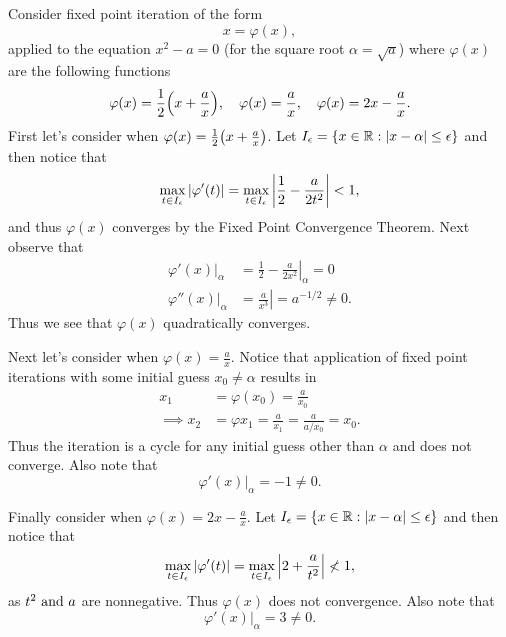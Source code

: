 \documentclass[12pt]{report}
\begin{document}
\begin{solution}

    \noindent
    Consider fixed point iteration of the form
    \[ 
        x = \varphi(x),    
    \]
    applied to the equation $x^2  - a = 0$ (for the square root $\alpha = \sqrt{a}$) where $\varphi(x)$ are the following functions
    \[
        \varphi(x) = \frac{1}{2}{\left(x + \frac{a}{x}\right)}, ~~~ \varphi(x) = \frac{a}{x}, ~~~ \varphi(x) = 2x - \frac{a}{x}.
    \]
    First let's consider when $\varphi(x) = \frac{1}{2}{\left(x + \frac{a}{x}\right)}$. Let $I_{\epsilon} = \{x \in {\mathbb R}: |x -\alpha| \leq {\epsilon}\}$ and then notice that 
    \[ 
        \max_{t \in I_{\epsilon}} \left| \varphi'(t) \right| = \max_{t \in I_{\epsilon}} \left| \frac{1}{2} - \frac{a}{2t^2} \right| < 1,
    \]
    and thus $\varphi(x)$ converges by the Fixed Point Convergence Theorem. Next observe that
    \begin{align*}
        \left. \varphi'(x) \right|_{\alpha} &= \left. \frac{1}{2} - \frac{a}{2x^2} \right|_{\alpha} = 0\\
        \left. \varphi''(x)  \right|_{\alpha} &= \left. \frac{a}{x^3} \right| = a^{-1/2} \neq 0. 
    \end{align*}
    Thus we see that $\varphi(x)$ quadratically converges.
    
    \noindent
    Next let's consider when $\varphi(x) = \frac{a}{x}$. Notice that application of fixed point iterations with some initial guess $x_0 \neq \alpha$ results in
    \begin{align*}
        x_1 &= \varphi(x_0) = \frac{a}{x_0}\\
        \implies x_2 &= \varphi{x_1} = \frac{a}{x_1} = \frac{a}{a/x_0} = x_0.
    \end{align*} 
    Thus the iteration is a cycle for any initial guess other than $\alpha$ and does not converge. Also note that
    \[ 
        \left. \varphi'(x) \right|_\alpha = -1 \neq 0. 
    \] 


    \noindent
    Finally consider when $\varphi(x) = 2x - \frac{a}{x}$. Let $I_{\epsilon} = \{x \in {\mathbb R}: |x -\alpha| \leq {\epsilon}\}$ and then notice that 
    \[ 
        \max_{t \in I_{\epsilon}} \left| \varphi'(t) \right| = \max_{t \in I_{\epsilon}} \left| 2 + \frac{a}{t^2} \right| \nless 1,
    \]
    as $t^2 {~\text{and}~} a$ are nonnegative. Thus $\varphi(x)$ does not convergence. Also note that
    \[ 
        \left. \varphi'(x) \right|_\alpha = 3 \neq 0.
    \]
\end{solution}



\newpage
\end{document}
